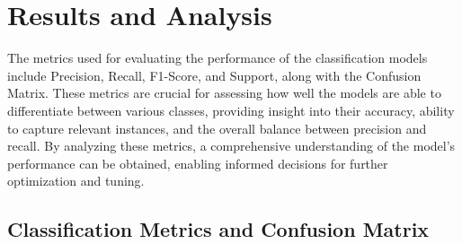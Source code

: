 
\pagebreak

\section{Results and Analysis}




\noindent
The metrics used for evaluating the performance of the classification models include Precision, Recall, F1-Score, and Support, along with the Confusion Matrix. These metrics are crucial for assessing how well the models are able to differentiate between various classes, providing insight into their accuracy, ability to capture relevant instances, and the overall balance between precision and recall. By analyzing these metrics, a comprehensive understanding of the model's performance can be obtained, enabling informed decisions for further optimization and tuning.

\subsection{Classification Metrics and Confusion Matrix}

